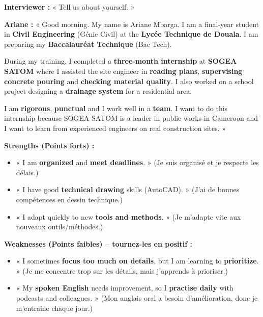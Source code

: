 \documentclass[11pt]{article}
\begin{document}
\begin{exemplebox}
\textbf{Interviewer :} « Tell us about yourself. »

\textbf{Ariane :} « Good morning. My name is Ariane Mbarga. I am a final-year student in \textbf{Civil Engineering} (Génie Civil) at the \textbf{Lycée Technique de Douala}. I am preparing my \textbf{Baccalauréat Technique} (Bac Tech). 

During my training, I completed a \textbf{three-month internship} at \textbf{SOGEA SATOM} where I assisted the site engineer in \textbf{reading plans}, \textbf{supervising concrete pouring} and \textbf{checking material quality}. I also worked on a school project designing a \textbf{drainage system} for a residential area.

I am \textbf{rigorous}, \textbf{punctual} and I work well in a \textbf{team}. I want to do this internship because SOGEA SATOM is a leader in public works in Cameroon and I want to learn from experienced engineers on real construction sites. »
\end{exemplebox}

\begin{exemplebox}
\textbf{Strengths (Points forts) :}
\begin{itemize}
    \item « I am \textbf{organized} and \textbf{meet deadlines}. » (Je suis organisé et je respecte les délais.)
    \item « I have good \textbf{technical drawing} skills (AutoCAD). » (J'ai de bonnes compétences en dessin technique.)
    \item « I adapt quickly to new \textbf{tools and methods}. » (Je m'adapte vite aux nouveaux outils/méthodes.)
\end{itemize}

\textbf{Weaknesses (Points faibles) -- tournez-les en positif :}
\begin{itemize}
    \item « I sometimes \textbf{focus too much on details}, but I am learning to \textbf{prioritize}. » (Je me concentre trop sur les détails, mais j'apprends à prioriser.)
    \item « My \textbf{spoken English} needs improvement, so I \textbf{practise daily} with podcasts and colleagues. » (Mon anglais oral a besoin d'amélioration, donc je m'entraîne chaque jour.)
\end{itemize}
\end{exemplebox}
\end{document}
